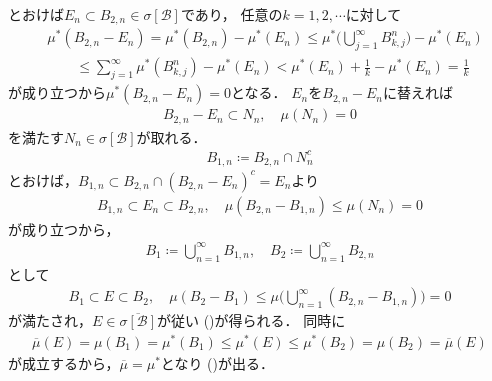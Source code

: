 \begin{prf}
\begin{description}
					とおけば$E_n \subset B_{2,n} \in \sigma[\mathcal{B}]$であり，
					任意の$k = 1,2,\cdots$に対して
					\begin{align}
						&\mu^*(B_{2,n} - E_n) = \mu^*(B_{2,n}) - \mu^*(E_n)
						\leq \mu^*\Biggl( \bigcup_{j=1}^\infty B^n_{k,j} \Biggr) - \mu^*(E_n) \\
						&\qquad \leq \sum_{j=1}^\infty \mu^*\left( B^n_{k,j} \right) - \mu^*(E_n)
						< \mu^*(E_n) + \frac{1}{k} - \mu^*(E_n)
						= \frac{1}{k}
					\end{align}
					が成り立つから$\mu^*(B_{2,n} - E_n) = 0$となる．
					$E_n$を$B_{2,n} - E_n$に替えれば
					\begin{align}
						B_{2,n} - E_n \subset N_n, \quad \mu(N_n) = 0
					\end{align}
					を満たす$N_n \in \sigma[\mathcal{B}]$が取れる．
					\begin{align}
						B_{1,n} \coloneqq B_{2,n} \cap N_n^c
					\end{align}
					とおけば，$B_{1,n} \subset B_{2,n} \cap (B_{2,n} - E_n)^c = E_n$より
					\begin{align}
						B_{1,n} \subset E_n \subset B_{2,n},
						\quad \mu(B_{2,n} - B_{1,n}) \leq \mu(N_n) = 0
					\end{align}
					が成り立つから，
					\begin{align}
						B_1 \coloneqq \bigcup_{n=1}^\infty B_{1,n},
						\quad B_2 \coloneqq \bigcup_{n=1}^\infty B_{2,n}
					\end{align}
					として
					\begin{align}
						B_1 \subset E \subset B_2,
						\quad \mu(B_2 - B_1) \leq \mu\Biggl( \bigcup_{n=1}^\infty(B_{2,n} - B_{1,n}) \Biggr) = 0
					\end{align}
					が満たされ，$E \in \overline{\sigma[\mathcal{B}]}$が従い
					()が得られる．
					同時に
					\begin{align}
						\overline{\mu}(E) = \mu(B_1) = \mu^*(B_1)
						\leq \mu^*(E) \leq \mu^*(B_2) = \mu(B_2) = \overline{\mu}(E)
					\end{align}
					が成立するから，$\overline{\mu} = \mu^*$となり
					()が出る．
					\QED
			\end{description}
		\end{prf}
		

